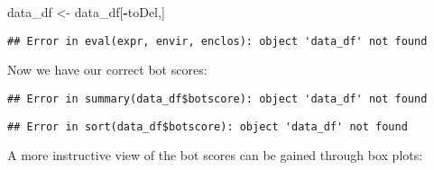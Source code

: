 \documentclass[]{article}
\newenvironment{Shaded}{\begin{snugshade}}{\end{snugshade}}
\newcommand{\DataTypeTok}[1]{\textcolor[rgb]{0.13,0.29,0.53}{#1}}
\newcommand{\KeywordTok}[1]{\textcolor[rgb]{0.13,0.29,0.53}{\textbf{#1}}}
\newcommand{\NormalTok}[1]{#1}
\newcommand{\OperatorTok}[1]{\textcolor[rgb]{0.81,0.36,0.00}{\textbf{#1}}}
\newcommand{\StringTok}[1]{\textcolor[rgb]{0.31,0.60,0.02}{#1}}
\begin{document}
\begin{Shaded}
\begin{Highlighting}[]
\NormalTok{data_df <-}\StringTok{ }\NormalTok{data_df[}\OperatorTok{-}\NormalTok{toDel,]}
\end{Highlighting}
\end{Shaded}

\begin{verbatim}
## Error in eval(expr, envir, enclos): object 'data_df' not found
\end{verbatim}

Now we have our correct bot scores:

\begin{Shaded}
\end{Shaded}

\begin{verbatim}
## Error in summary(data_df$botscore): object 'data_df' not found
\end{verbatim}

\begin{Shaded}
\end{Shaded}

\begin{verbatim}
## Error in sort(data_df$botscore): object 'data_df' not found
\end{verbatim}

A more instructive view of the bot scores can be gained through box
plots:

\begin{Shaded}
\end{Shaded}
\end{document}
